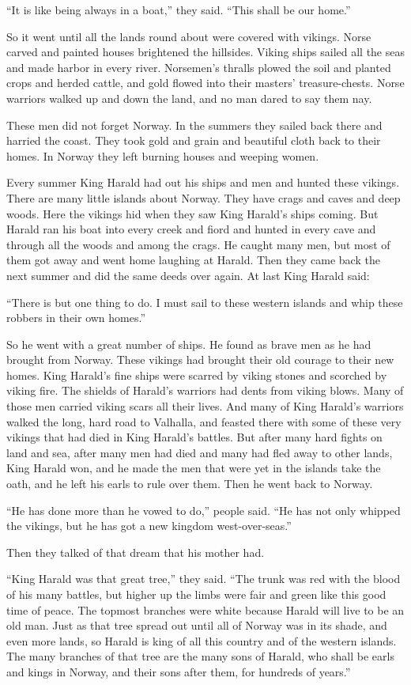 ``It is like being always in a boat,'' they said. ``This shall be our
home.''

So it went until all the lands round about were covered with vikings.
Norse carved and painted houses brightened the hillsides. Viking ships
sailed all the seas and made harbor in every river. Norsemen's thralls
plowed the soil and planted crops and herded cattle, and gold flowed
into their masters' treasure-chests. Norse warriors walked up and down
the land, and no man dared to say them nay.

These men did not forget Norway. In the summers they sailed back there
and harried the coast. They took gold and grain and beautiful cloth back
to their homes. In Norway they left burning houses and weeping women.

Every summer King Harald had out his ships and men and hunted these
vikings. There are many little islands about Norway. They have crags and
caves and deep woods. Here the vikings hid when they saw King Harald's
ships coming. But Harald ran his boat into every creek and fiord and
hunted in every cave and through all the woods and among the crags. He
caught many men, but most of them got away and went home laughing at
Harald. Then they came back the next summer and did the same deeds over
again. At last King Harald said:

``There is but one thing to do. I must sail to these western islands and
whip these robbers in their own homes.''

So he went with a great number of ships. He found as brave men as he had
brought from Norway. These vikings had brought their old courage to
their new homes. King Harald's fine ships were scarred by viking stones
and scorched by viking fire. The shields of Harald's warriors had dents
from viking blows. Many of those men carried viking scars all their
lives. And many of King Harald's warriors walked the long, hard road to
Valhalla, and feasted there with some of these very vikings that had
died in King Harald's battles. But after many hard fights on land and
sea, after many men had died and many had fled away to other lands, King
Harald won, and he made the men that were yet in the islands take the
oath, and he left his earls to rule over them. Then he went back to
Norway.

``He has done more than he vowed to do,'' people said. ``He has not only
whipped the vikings, but he has got a new kingdom west-over-seas.''

Then they talked of that dream that his mother had.

``King Harald was that great tree,'' they said. ``The trunk was red with
the blood of his many battles, but higher up the limbs were fair and
green like this good time of peace. The topmost branches were white
because Harald will live to be an old man. Just as that tree spread out
until all of Norway was in its shade, and even more lands, so Harald is
king of all this country and of the western islands. The many branches
of that tree are the many sons of Harald, who shall be earls and kings
in Norway, and their sons after them, for hundreds of years.''

